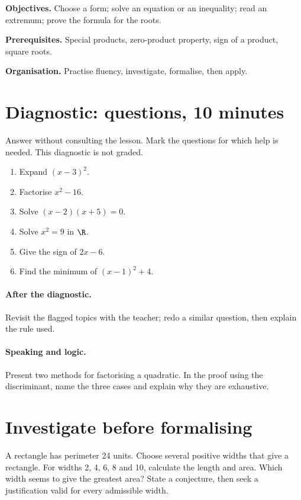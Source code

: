 \label{C02}
\begin{keypoint}
\textbf{Objectives.} Choose a form; solve an equation or an inequality; read an extremum; prove the formula for the roots.

\textbf{Prerequisites.} Special products, zero-product property, sign of a product, square roots.

\textbf{Organisation.} Practise fluency, investigate, formalise, then apply.\end{keypoint}
\section*{Diagnostic:  questions, 10 minutes}\label{C02-D}
Answer without consulting the lesson. Mark the questions for which help is needed. This diagnostic is not graded.
\begin{enumerate}
\item Expand $(x-3)^2$.
\item Factorise $x^2-16$.
\item Solve $(x-2)(x+5)=0$.
\item Solve $x^2=9$ in $\R$.
\item Give the sign of $2x-6$.
\item Find the minimum of $(x-1)^2+4$.
\end{enumerate}
\paragraph{After the diagnostic.} Revisit the flagged topics with the teacher; redo a similar question, then explain the rule used.
\paragraph{Speaking and logic.} Present two methods for factorising a quadratic. In the proof using the discriminant, name the three cases and explain why they are exhaustive.
\mxnewpage
\section*{Investigate before formalising}\label{C02-RECH}
A rectangle has perimeter 24 units. Choose several positive widths that give a rectangle. For widths 2, 4, 6, 8 and 10, calculate the length and area. Which width seems to give the greatest area? State a conjecture, then seek a justification valid for every admissible width.
